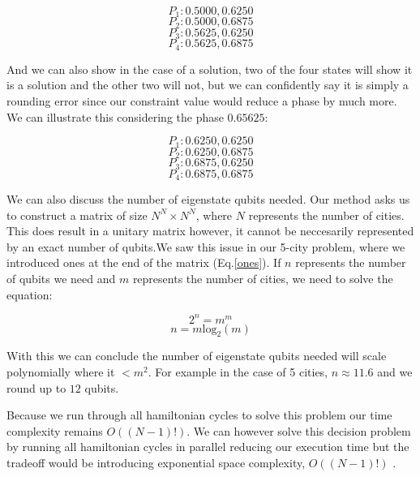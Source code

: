 \documentclass[msc,oneside]{ubcthesis}
\begin{document}
 $$P_1: 0.5000, 0.6250$$
 $$P_2: 0.5000, 0.6875$$
 $$P_3: 0.5625, 0.6250$$
 $$P_4: 0.5625, 0.6875$$
 
And we can also show in the case of a solution, two of the four states will show it is a solution and the other two will not, but we can confidently say it is simply a rounding error since our constraint value would reduce a phase by much more. We can illustrate this considering the phase $0.65625$:



$$P_1: 0.6250, 0.6250$$
$$P_2: 0.6250, 0.6875$$
$$P_3: 0.6875, 0.6250$$
$$P_4: 0.6875, 0.6875$$


We can also discuss the number of eigenstate qubits needed. Our method asks us to construct a matrix of size $N^N \times N^N$, where $N$ represents the number of cities. This does result in a unitary matrix however, it cannot be neccesarily represented by an exact number of qubits.We saw this issue in our 5-city problem, where we introduced ones at the end of the matrix (Eq.\ref{ones}). If $n$ represents the number of qubits we need and $m$ represents the number of cities, we need to solve the equation:

$$2^n = m^m$$
$$n = m\mathrm{log}_2(m)$$

With this we can conclude the number of eigenstate qubits needed will scale polynomially where it $<m^2$. For example in the case of 5 cities, $n \approx 11.6$ and we round up to $12$ qubits. 

Because we run through all hamiltonian cycles to solve this problem our time complexity remains $O((N-1)!)$. We can however solve this decision problem by running all hamiltonian cycles in parallel reducing our  execution time but the tradeoff would be introducing exponential space complexity, $O((N-1)!)$ .
	
	
	
	
\end{document}
